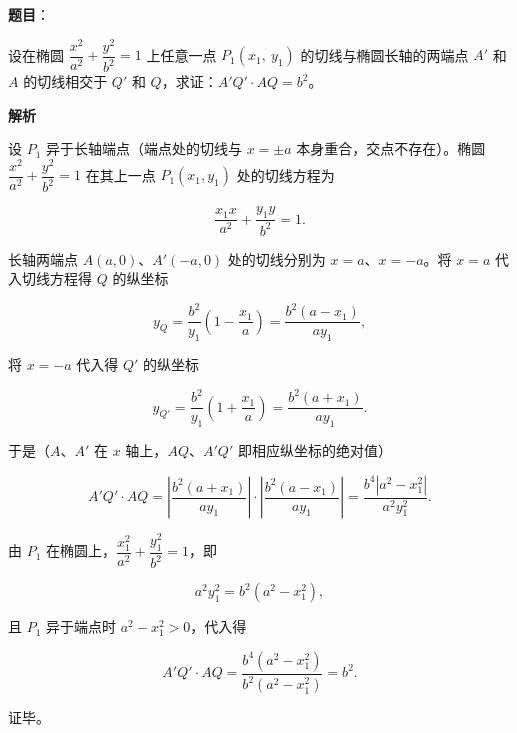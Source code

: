 \begin{answer}

\textbf{题目}：

设在椭圆 $\dfrac{x^{2}}{a^{2}}+\dfrac{y^{2}}{b^{2}}=1$ 上任意一点 $P_{1}\left(x_{1},\ y_{1}\right)$ 的切线与椭圆长轴的两端点 $A'$ 和 $A$ 的切线相交于 $Q'$ 和 $Q$，求证：$A'Q'\cdot AQ=b^{2}$。

\textbf{解析}

设 $P_{1}$ 异于长轴端点（端点处的切线与 $x=\pm a$ 本身重合，交点不存在）。椭圆 $\dfrac{x^{2}}{a^{2}}+\dfrac{y^{2}}{b^{2}}=1$ 在其上一点 $P_{1}(x_{1},y_{1})$ 处的切线方程为

\nopagebreak[4]
\[
\frac{x_{1}x}{a^{2}}+\frac{y_{1}y}{b^{2}}=1.
\]

长轴两端点 $A(a,0)$、$A'(-a,0)$ 处的切线分别为 $x=a$、$x=-a$。将 $x=a$ 代入切线方程得 $Q$ 的纵坐标

\nopagebreak[4]
\[
y_{Q}=\frac{b^{2}}{y_{1}}\left(1-\frac{x_{1}}{a}\right)=\frac{b^{2}(a-x_{1})}{ay_{1}},
\]

将 $x=-a$ 代入得 $Q'$ 的纵坐标

\nopagebreak[4]
\[
y_{Q'}=\frac{b^{2}}{y_{1}}\left(1+\frac{x_{1}}{a}\right)=\frac{b^{2}(a+x_{1})}{ay_{1}}.
\]

于是（$A$、$A'$ 在 $x$ 轴上，$AQ$、$A'Q'$ 即相应纵坐标的绝对值）

\nopagebreak[4]
\[
A'Q'\cdot AQ
=\left|\frac{b^{2}(a+x_{1})}{ay_{1}}\right|\cdot\left|\frac{b^{2}(a-x_{1})}{ay_{1}}\right|
=\frac{b^{4}\left|a^{2}-x_{1}^{2}\right|}{a^{2}y_{1}^{2}}.
\]

由 $P_{1}$ 在椭圆上，$\dfrac{x_{1}^{2}}{a^{2}}+\dfrac{y_{1}^{2}}{b^{2}}=1$，即

\nopagebreak[4]
\[
a^{2}y_{1}^{2}=b^{2}\left(a^{2}-x_{1}^{2}\right),
\]

且 $P_{1}$ 异于端点时 $a^{2}-x_{1}^{2}>0$，代入得

\nopagebreak[4]
\[
A'Q'\cdot AQ
=\frac{b^{4}\left(a^{2}-x_{1}^{2}\right)}{b^{2}\left(a^{2}-x_{1}^{2}\right)}=b^{2}.
\]

证毕。


\end{answer}